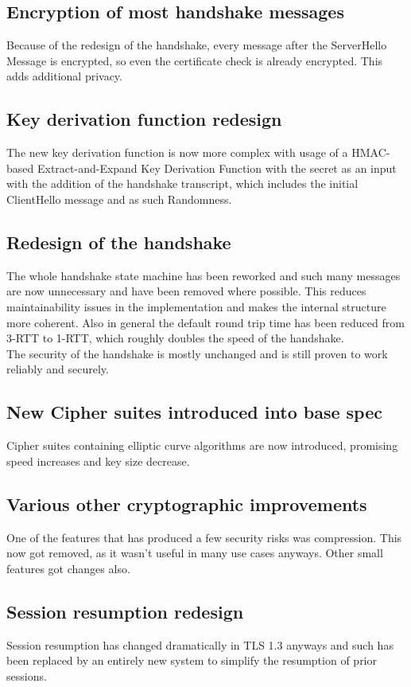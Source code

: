\documentclass[a4paper,conference]{IEEEtran}
\begin{document}
\subsection{Encryption of most handshake messages}
Because of the redesign of the handshake, every message after the ServerHello Message is encrypted, so even the certificate check is already encrypted. This adds additional privacy.
\subsection{Key derivation function redesign}
The new key derivation function is now more complex with usage of a HMAC-based Extract-and-Expand Key Derivation Function\cite{rfc5869} with the secret as an input with the addition of the handshake transcript, which includes the initial ClientHello message and as such Randomness.
\subsection{Redesign of the handshake}
The whole handshake state machine has been reworked and such many messages are now unnecessary and have been removed where possible. This reduces maintainability issues in the implementation and makes the internal structure more coherent. Also in general the default round trip time has been reduced from 3-RTT to 1-RTT, which roughly doubles the speed of the handshake.\\
The security of the handshake is mostly unchanged and is still proven to work reliably and securely\cite{7546519}.
\subsection{New Cipher suites introduced into base spec}
Cipher suites containing elliptic curve algorithms are now introduced, promising speed increases and key size decrease.
\subsection{Various other cryptographic improvements}
One of the features that has produced a few security risks was compression. This now got removed, as it wasn't useful in many use cases anyways. Other small features got changes also.
\subsection{Session resumption redesign}
Session resumption has changed dramatically in TLS 1.3 anyways and such has been replaced by an entirely new system to simplify the resumption of prior sessions.
\end{document}
